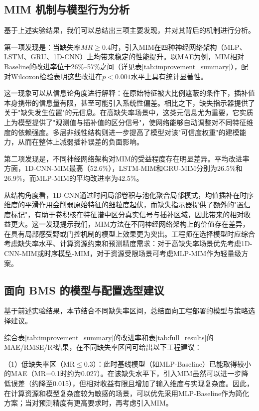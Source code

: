 \documentclass[10pt,a4paper]{ctexart}
\begin{document}
\subsection{MIM 机制与模型行为分析}

基于上述实验结果，我们可以总结出三项主要发现，并对其背后的机制进行分析。

第一项发现是：当缺失率$MR \ge 0.4$时，引入MIM在四种神经网络架构（MLP、LSTM、GRU、1D-CNN）上均带来稳定的性能提升。以MAE为例，MIM相对Baseline的改进率位于26\%--57\%之间（详见表\ref{tab:improvement_summary}），配对Wilcoxon检验表明这些改进在$p<0.001$水平上具有统计显著性。

这一现象可以从信息论角度进行解释：在原始特征被大比例遮蔽的条件下，插补值本身携带的信息量有限，甚至可能引入系统性偏差。相比之下，缺失指示器提供了关于"缺失发生位置"的元信息。在高缺失率场景中，这类元信息尤为重要，它实质上为模型提供了"观测值与插补值的区分信号"，使网络能够自动调整对不同特征维度的依赖强度。多层非线性结构则进一步提高了模型对该"可信度权重"的建模能力，从而在整体上减弱插补误差的负面影响。

第二项发现是，不同神经网络架构对MIM的受益程度存在明显差异。平均改进率方面，1D-CNN-MIM最高（52.6\%），LSTM-MIM和GRU-MIM分别为26.5\%和26.9\%，而MLP-MIM的平均改进率为42.5\%。

从结构角度看，1D-CNN通过时间局部卷积与池化聚合局部模式，均值插补在时序维度的平滑作用会削弱原始特征的细粒度起伏，而缺失指示器提供了额外的"置信度标记"，有助于卷积核在特征谱中区分真实信号与插补区域，因此带来的相对收益更大。这一发现提示我们，MIM方法在不同神经网络架构上的价值存在差异，在具有局部感受野或门控机制的模型上效果更为突出。工程师在选择模型时应综合考虑缺失率水平、计算资源约束和预测精度需求：对于高缺失率场景优先考虑1D-CNN-MIM或时序模型-MIM，对于资源受限场景可考虑MLP-MIM作为轻量级方案。

\subsection{面向 BMS 的模型与配置选型建议}

基于前述实验结果，本节结合不同缺失率区间，总结面向工程部署的模型与策略选择建议。

综合表\ref{tab:improvement_summary}的改进率和表\ref{tab:full_results}的MAE/RMSE/R²结果，在不同缺失率区间可给出以下工程建议：

（1）低缺失率区（MR$\leq$0.3）：此时基线模型（如MLP-Baseline）已能取得较小的MAE（MR=0.1时约为0.027）。在该缺失水平下，引入MIM虽然可以进一步降低误差（约降至0.015），但相对收益有限且增加了输入维度与实现复杂度。因此，在计算资源和模型复杂度较为敏感的场景，可以优先采用MLP-Baseline作为简化方案；当对预测精度有更高要求时，再考虑引入MIM。
\end{document}
